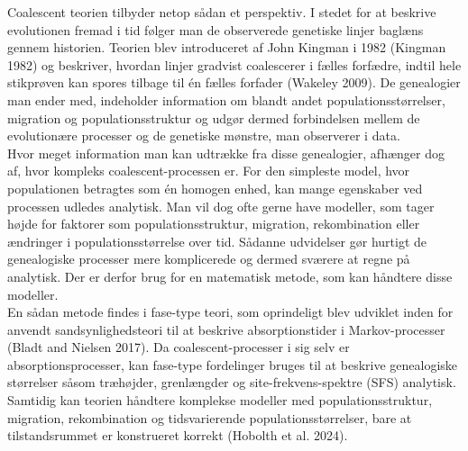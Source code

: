\documentclass[
  10pt,
  a4paper,
]{scrbook}
\begin{document}
Coalescent teorien tilbyder netop sådan et perspektiv. I stedet for at
beskrive evolutionen fremad i tid følger man de observerede genetiske
linjer baglæns gennem historien. Teorien blev introduceret af John
Kingman i 1982 (Kingman 1982) og beskriver, hvordan linjer gradvist
coalescerer i fælles forfædre, indtil hele stikprøven kan spores tilbage
til én fælles forfader (Wakeley 2009). De genealogier man ender med,
indeholder information om blandt andet populationsstørrelser, migration
og populationsstruktur og udgør dermed forbindelsen mellem de
evolutionære processer og de genetiske mønstre, man observerer i data.\\
Hvor meget information man kan udtrække fra disse genealogier, afhænger
dog af, hvor kompleks coalescent-processen er. For den simpleste model,
hvor populationen betragtes som én homogen enhed, kan mange egenskaber
ved processen udledes analytisk. Man vil dog ofte gerne have modeller,
som tager højde for faktorer som populationsstruktur, migration,
rekombination eller ændringer i populationsstørrelse over tid. Sådanne
udvidelser gør hurtigt de genealogiske processer mere komplicerede og
dermed sværere at regne på analytisk. Der er derfor brug for en
matematisk metode, som kan håndtere disse modeller.\\
En sådan metode findes i fase-type teori, som oprindeligt blev udviklet
inden for anvendt sandsynlighedsteori til at beskrive absorptionstider i
Markov-processer (Bladt and Nielsen 2017). Da coalescent-processer i sig
selv er absorptionsprocesser, kan fase-type fordelinger bruges til at
beskrive genealogiske størrelser såsom træhøjder, grenlængder og
site-frekvens-spektre (SFS) analytisk. Samtidig kan teorien håndtere
komplekse modeller med populationsstruktur, migration, rekombination og
tidsvarierende populationsstørrelser, bare at tilstandsrummet er
konstrueret korrekt (Hobolth et al. 2024).
\end{document}

